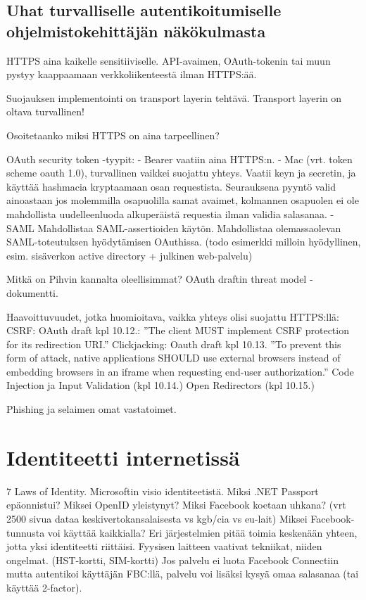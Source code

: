 \documentclass[finnish,gradu]{tktltiki}
\begin{document}

  \subsection{Uhat turvalliselle autentikoitumiselle ohjelmistokehittäjän näkökulmasta} %
  \label{sec:uhat_turvalliselle_autentikoitumiselle}
    HTTPS aina kaikelle sensitiiviselle. API-avaimen, OAuth-tokenin tai muun pystyy kaappaamaan verkkoliikenteestä ilman HTTPS:ää.

    Suojauksen implementointi on transport layerin tehtävä. Transport layerin on oltava turvallinen!

    Osoitetaanko miksi HTTPS on aina tarpeellinen?

    OAuth security token -tyypit:
    - Bearer vaatiin aina HTTPS:n.
    - Mac (vrt. token scheme oauth 1.0), turvallinen vaikkei suojattu yhteys. Vaatii keyn ja secretin, ja käyttää hashmacia kryptaamaan osan requestista. Seurauksena pyyntö valid ainoastaan jos molemmilla osapuolilla samat avaimet, kolmannen osapuolen ei ole mahdollista uudelleenluoda alkuperäistä requestia ilman validia salasanaa.
    - SAML Mahdollistaa SAML-assertioiden käytön. Mahdollistaa olemassaolevan SAML-toteutuksen hyödytämisen OAuthissa. (todo esimerkki milloin hyödyllinen, esim. sisäverkon active directory + julkinen web-palvelu)

    Mitkä on Pihvin kannalta oleellisimmat?
    OAuth draftin threat model -dokumentti.

    Haavoittuvuudet, jotka huomioitava, vaikka yhteys olisi suojattu HTTPS:llä:
    CSRF: OAuth draft kpl 10.12.: ''The client MUST implement CSRF protection for its redirection URI.''
    Clickjacking: Oauth draft kpl 10.13.
       ''To prevent this form of attack, native applications SHOULD use
       external browsers instead of embedding browsers in an iframe when
       requesting end-user authorization.''
    Code Injection ja Input Validation (kpl 10.14.)
    Open Redirectors (kpl 10.15.)

    Phishing ja selaimen omat vastatoimet.




\section{Identiteetti internetissä} %
\label{sec:identiteetti_internetissä}
  7 Laws of Identity.
  Microsoftin visio identiteetistä. Miksi .NET Passport epäonnistui?
  Miksei OpenID yleistynyt?
  Miksi Facebook koetaan uhkana? (vrt 2500 sivua dataa keskivertokansalaisesta vs kgb/cia vs eu-lait)
  Miksei Facebook-tunnusta voi käyttää kaikkialla?
  Eri järjestelmien pitää toimia keskenään yhteen, jotta yksi identiteetti riittäisi.
  Fyysisen laitteen vaativat tekniikat, niiden ongelmat. (HST-kortti, SIM-kortti)
  Jos palvelu ei luota Facebook Connectiin mutta autentikoi käyttäjän FBC:llä, palvelu voi lisäksi kysyä omaa salasanaa (tai käyttää 2-factor).
\end{document}
